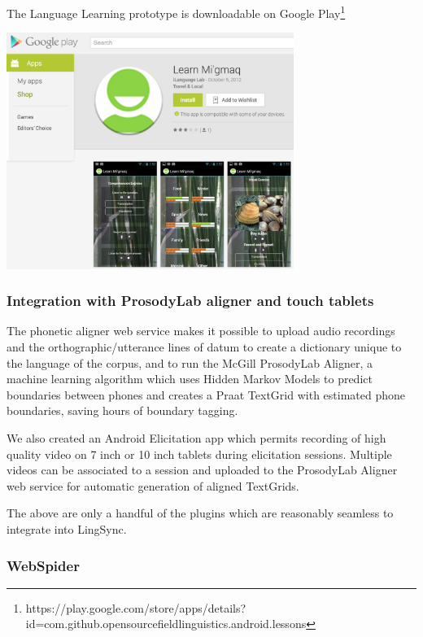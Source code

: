\documentclass[letterpaper, 12pt, dvips]{mitwpl}
\begin{document}
\begin{exe} 
\ex The Language Learning prototype is downloadable on Google Play\footnote{https://play.google.com/store/apps/details?id=com.github.opensourcefieldlinguistics.android.lessons}

 \centering
   \includegraphics[width=0.7\textwidth]{languageLearningApp} 

\label{ex:languageLearningApp}
\end{exe}

\subsubsection{Integration with ProsodyLab aligner and touch tablets}
\label{sec:phoneticwebservice}

The phonetic aligner web service makes it possible to upload audio recordings and the orthographic/utterance lines of datum to create a dictionary unique to the language of the corpus,
and to run the McGill ProsodyLab Aligner,
a machine learning algorithm which uses Hidden Markov Models to predict boundaries between phones and creates a Praat TextGrid with estimated phone boundaries,
saving hours of boundary tagging.


We also created an Android Elicitation app which permits recording of high quality video on 7 inch or 10 inch tablets during elicitation sessions.
Multiple videos can be associated to a session and uploaded to the ProsodyLab Aligner web service for automatic generation of aligned TextGrids. 

The above are only a handful of the plugins which are reasonably seamless to integrate into LingSync.



\subsubsection{WebSpider}
\end{document}
